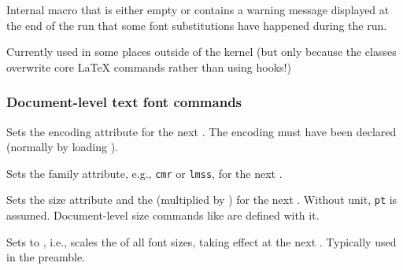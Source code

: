 \documentclass{l3in2edoc}
\begin{document}
\begin{function}[int]
  {
    \@defaultsubs
  }
  Internal macro that is either empty or contains a warning message
  displayed at the end of the run that some font substitutions have
  happened during the run.

  Currently used in some places outside of the kernel (but only
  because the classes overwrite core \LaTeX{} commands rather than
  using hooks!)
\end{function}



\subsubsection{Document-level text font commands}

\begin{function}[user]
  {
    \fontencoding
  }
  \begin{syntax}
     
  \end{syntax}
  Sets the encoding attribute for the next . The
  encoding must have been declared (normally by loading ).
\end{function}



\begin{function}[user]
  {
    \fontfamily
  }
  \begin{syntax}
     
  \end{syntax}
  Sets the family attribute, e.g., \texttt{cmr} or \texttt{lmss},
  for the next .
\end{function}


\begin{function}[user]
  {
    \fontsize
  }
  \begin{syntax}
      
  \end{syntax}
  Sets the size attribute and the  (multiplied by
  ) for the next . Without unit,
  \texttt{pt} is assumed. Document-level size commands like
   are defined with it.
\end{function}




\begin{function}[]
  {
    \linespread
  }
  \begin{syntax}
     
  \end{syntax}
  Sets  to , i.e., scales the
   of all font sizes, taking effect at the next
  . Typically used in the preamble.
\end{function}
\end{document}
